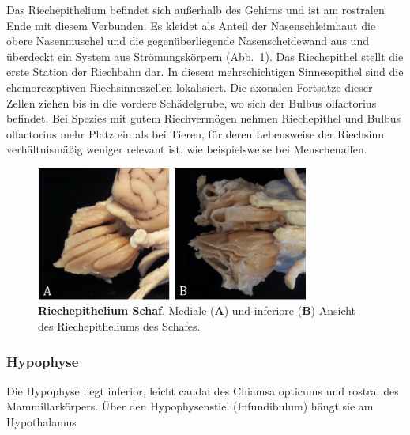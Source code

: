 \documentclass[12pt,a4paper,pdftex]{article}
\begin{document}
Das Riechepithelium befindet sich außerhalb des Gehirns und ist am rostralen Ende mit diesem Verbunden. Es kleidet als Anteil der Nasenschleimhaut die obere Nasenmuschel und die gegenüberliegende Nasenscheidewand aus und überdeckt  ein  System aus Strömungskörpern (Abb.~\ref{fig:Riechepithel}). Das Riechepithel stellt die erste Station der Riechbahn dar. In diesem mehrschichtigen Sinnesepithel sind die chemorezeptiven Riechsinneszellen lokalisiert. Die axonalen Fortsätze dieser Zellen ziehen bis in die vordere Schädelgrube, wo sich der Bulbus olfactorius befindet. Bei Spezies mit gutem Riechvermögen nehmen Riechepithel und Bulbus olfactorius mehr Platz ein als bei Tieren, für deren Lebensweise der Riechsinn verhältnismäßig weniger relevant ist, wie beispielsweise bei Menschenaffen.

\begin{figure}[H]
    \centering
    \includegraphics[width=0.8\textwidth]{pictures/Bilder_Jule/Schaf/Ausschnitte/Riechepithel.png}
    \caption[Riechepithelium Schaf]{\textbf{Riechepithelium Schaf}. Mediale (\textbf{A}) und inferiore (\textbf{B}) Ansicht des Riechepitheliums des Schafes.}
    \label{fig:Riechepithel}
\end{figure}{}


\subsubsection*{Hypophyse}
\label{subsubsec:hypophyse} 

Die Hypophyse liegt inferior, leicht caudal des Chiamsa opticums und rostral des Mammillarkörpers. Über den Hypophysenstiel (Infundibulum) hängt sie am Hypothalamus 
\end{document}
